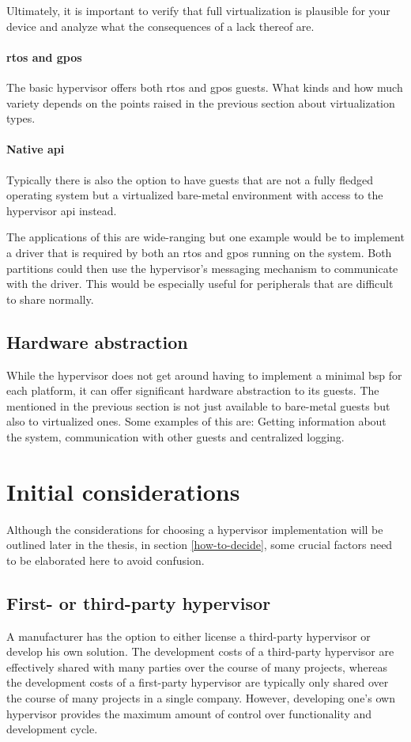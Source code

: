 Ultimately, it is important to verify that full virtualization is plausible for your device and analyze what the consequences of a lack thereof are.
\paragraph{\acrshort{rtos} and \acrshort{gpos}}
The basic hypervisor offers both \acrfull{rtos} and \acrfull{gpos} guests. What kinds and how much variety depends on the points raised in the previous section about virtualization types. 
\paragraph{Native \acrshort{api}}
Typically there is also the option to have guests that are not a fully fledged operating system but a virtualized bare-metal environment with access to the hypervisor \acrshort{api} instead. 

The applications of this are wide-ranging but one example would be to implement a driver that is required by both an \acrshort{rtos} and \acrshort{gpos} running on the system. Both partitions could then use the hypervisor's messaging mechanism to communicate with the driver. This would be especially useful for peripherals that are difficult to share normally.
\subsection{Hardware abstraction}
While the hypervisor does not get around having to implement a minimal \acrfull{bsp} for each platform, it can offer significant hardware abstraction to its guests. The  mentioned in the previous section is not just available to bare-metal guests but also to virtualized ones. Some examples of this are: Getting information about the system, communication with other guests and centralized logging.

\section{Initial considerations}
Although the considerations for choosing a hypervisor implementation will be outlined later in the thesis, in section \ref{how-to-decide}, some crucial factors need to be elaborated here to avoid confusion.
\subsection{First- or third-party hypervisor}
A manufacturer has the option to either license a third-party hypervisor or develop his own solution. The development costs of a third-party hypervisor are effectively shared with many parties over the course of many projects, whereas the development costs of a first-party hypervisor are typically only shared over the course of many projects in a single company. However, developing one's own hypervisor provides the maximum amount of control over functionality and development cycle.


